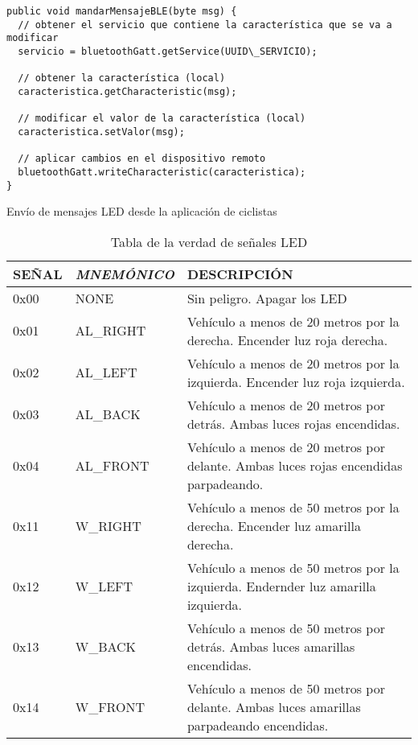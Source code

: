\begin{description}
\begin{listing}
\begin{minipage}{.4\textwidth}
\begin{verbatim}
public void mandarMensajeBLE(byte msg) {
  // obtener el servicio que contiene la característica que se va a modificar
  servicio = bluetoothGatt.getService(UUID\_SERVICIO);	
  
  // obtener la característica (local)
  caracteristica.getCharacteristic(msg);
  
  // modificar el valor de la característica (local)
  caracteristica.setValor(msg);
  
  // aplicar cambios en el dispositivo remoto
  bluetoothGatt.writeCharacteristic(caracteristica);	
}	
				\end{verbatim}
			\end{minipage}
		\caption{Envío de mensajes LED desde la aplicación de ciclistas}\label{alg:appciclistasBLE}
	\end{listing}
\end{description}

\begin{table}[H]
	\centering
	\caption{Tabla de la verdad de señales LED}\label{tab:tablaVerdadLED}
	\begin{tabular}{lll}
		\toprule
		\textbf{SEÑAL} & \emph{MNEMÓNICO} & DESCRIPCIÓN \\
		\midrule
		
		0x00    & NONE    & Sin peligro. Apagar los LED \\
		0x01    & AL\_RIGHT & Vehículo a menos de 20 metros por la derecha. Encender luz roja derecha. \\
		0x02    & AL\_LEFT & Vehículo a menos de 20 metros por la izquierda. Encender luz roja izquierda. \\
		0x03    & AL\_BACK & Vehículo a menos de 20 metros por detrás. Ambas luces rojas encendidas. \\
		0x04    & AL\_FRONT & Vehículo a menos de 20 metros por delante. Ambas luces rojas encendidas parpadeando. \\
		0x11    & W\_RIGHT & Vehículo a menos de 50 metros por la derecha. Encender luz amarilla derecha. \\
		0x12    & W\_LEFT & Vehículo a menos de 50 metros por la izquierda. Endernder luz amarilla izquierda. \\
		0x13    & W\_BACK & Vehículo a menos de 50 metros por detrás. Ambas luces amarillas encendidas. \\
		0x14    & W\_FRONT & Vehículo a menos de 50 metros por delante. Ambas luces amarillas parpadeando encendidas.\\
		\bottomrule
	\end{tabular}
\end{table}

